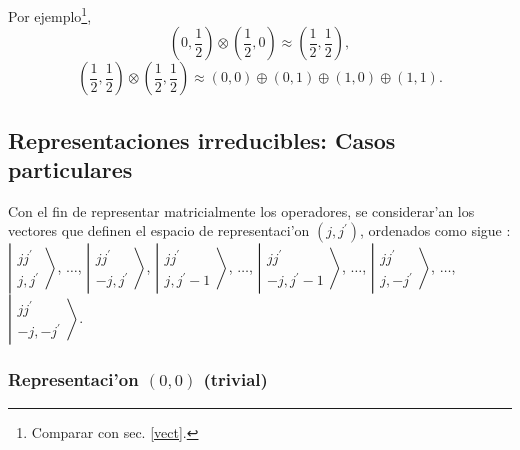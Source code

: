 Por ejemplo\footnote{%
Comparar con sec. \ref{vect}.}, 
\begin{equation}
\left( 0,\frac{1}{2}\right) \otimes \left( \frac{1}{2},0\right) \approx
\left( \frac{1}{2},\frac{1}{2}\right) , 
\end{equation}
\begin{equation}
\left( \frac{1}{2},\frac{1}{2}\right) \otimes \left( \frac{1}{2},\frac{1}{2}%
\right) \approx \left( 0,0\right) \oplus \left( 0,1\right) \oplus \left(
1,0\right) \oplus \left( 1,1\right) . 
\end{equation}

\subsection{Representaciones irreducibles: Casos particulares\label{reps}}

Con el fin de representar matricialmente los operadores, se considerar'an
los vectores que definen el espacio de representaci'on $\left(
j,j^{\prime }\right) $, ordenados como sigue : $\left| 
\begin{array}{c}
jj^{\prime } \\ 
j,j^{\prime }
\end{array}
\right\rangle $, $\ldots $, $\left| 
\begin{array}{c}
jj^{\prime } \\ 
-j,j^{\prime }
\end{array}
\right\rangle $, $\left| 
\begin{array}{c}
jj^{\prime } \\ 
j,j^{\prime }-1
\end{array}
\right\rangle $, $\ldots $, $\left| 
\begin{array}{c}
jj^{\prime } \\ 
-j,j^{\prime }-1
\end{array}
\right\rangle $, $\ldots $, $\left| 
\begin{array}{c}
jj^{\prime } \\ 
j,-j^{\prime }
\end{array}
\right\rangle $, $\ldots $, $\left| 
\begin{array}{c}
jj^{\prime } \\ 
-j,-j^{\prime }
\end{array}
\right\rangle $.

\subsubsection{Representaci'on $(0,0)$ (trivial)}

